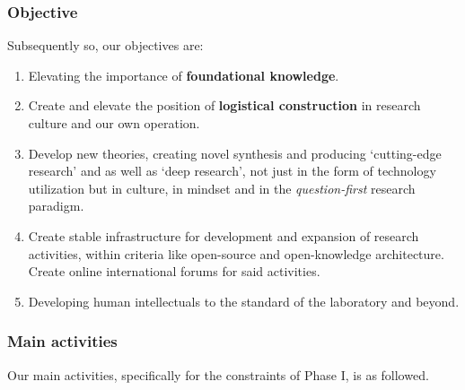 \documentclass[10pt,a4paper]{article}
\begin{document}
\subsubsection{Objective}

Subsequently so, our objectives are: 

\begin{enumerate}[topsep=0pt,itemsep=0pt]
    \item Elevating the importance of \textbf{foundational knowledge}. 
    \item Create and elevate the position of \textbf{logistical construction} in research culture and our own operation. 
    \item Develop new theories, creating novel synthesis and producing `cutting-edge research' and as well as `deep research', not just in the form of technology utilization but in culture, in mindset and in the \textit{question-first} research paradigm. 
    \item Create stable infrastructure for development and expansion of research activities, within criteria like open-source and open-knowledge architecture. Create online international forums for said activities. 
    \item Developing human intellectuals to the standard of the laboratory and beyond. 
\end{enumerate}

\subsubsection{Main activities}

Our main activities, specifically for the constraints of Phase I, is as followed. 
\end{document}

